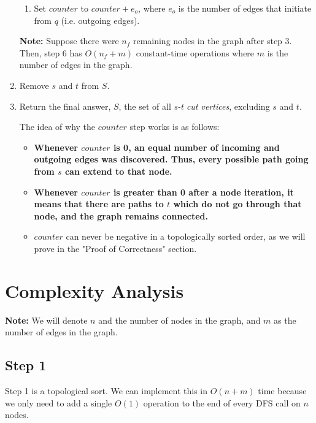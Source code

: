 \documentclass{article}
\begin{document}
\begin{enumerate}
\begin{enumerate}
            \item Set $counter$ to $counter + e_o$, where $e_o$ is the number of edges that initiate from $q$ (i.e. outgoing edges).
        \end{enumerate}

        \textbf{Note:} Suppose there were $n_f$ remaining nodes in the graph after step 3. Then, step 6 has $O(n_f + m)$ constant-time operations where $m$ is the number of edges in the graph.  
    
    \item Remove $s$ and $t$ from $S$.
    \item Return the final answer, $S$, the set of all \emph{s-t cut vertices}, excluding $s$ and $t$.

    The idea of why the $counter$ step works is as follows:

    \begin{itemize}
        \item \textbf{Whenever $counter$ is 0, an equal number of incoming and outgoing edges was discovered. Thus, every possible path going from $s$ can extend to that node.}
        \item \textbf{Whenever $counter$ is greater than 0 after a node iteration, it means that there are paths to $t$ which do not go through that node, and the graph remains connected.  }
        \item $counter$ can never be negative in a topologically sorted order, as we will prove in the "Proof of Correctness" section.
    \end{itemize}

\end{enumerate}

\section{Complexity Analysis}

\textbf{Note:} We will denote $n$ and the number of nodes in the graph, and $m$ as the number of edges in the graph. 

\subsection*{Step 1}

Step 1 is a topological sort. We can implement this in $O(n + m)$ time because we only need to add a single $O(1)$ operation to the end of every DFS call on $n$ nodes. 
\end{document}
